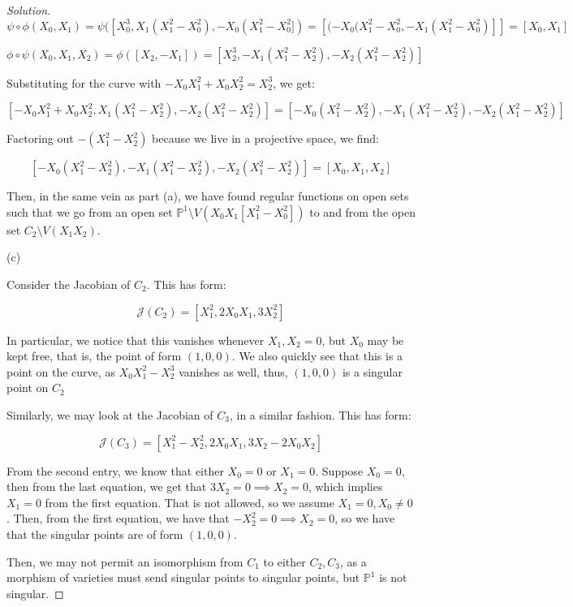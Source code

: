 \documentclass[10pt]{article}
\begin{document}
\begin{proof}[Solution]
$$\psi \circ \phi(X_0,X_1) = \psi([X_0^3, X_1(X_1^2 - X_0^2), -X_0(X_1^2 - X_0^2]) = [(-X_0(X_1^2 - X_0^2, -X_1(X_1^2 - X_0^2)]] = [X_0,X_1]$$


$$\phi \circ \psi(X_0,X_1, X_2) = \phi([X_2,-X_1]) = [X_2^3, -X_1(X_1^2-X_2^2), -X_2(X_1^2 - X_2^2)]$$

Substituting for the curve with $-X_0X_1^2  + X_0X_2^2 = X_2^3$, we get:

$$ [-X_0X_1^2  + X_0X_2^2, X_1(X_1^2-X_2^2), -X_2(X_1^2 - X_2^2)] =  [-X_0(X_1^2  - X_2^2), -X_1(X_1^2-X_2^2), -X_2(X_1^2 - X_2^2)]$$

Factoring out $-(X_1^2 - X_2^2)$ because we live in a projective space, we find:

$$[-X_0(X_1^2  - X_2^2), -X_1(X_1^2-X_2^2), -X_2(X_1^2 - X_2^2)] = [X_0,X_1,X_2]$$

Then, in the same vein as part (a), we have found regular functions on open sets such that we go from an open set $\mathbb{P}^1 \setminus V(X_0X_1[X_1^2 - X_0^2])$ to and from the open set $C_2 \setminus V(X_1X_2)$.

(c)

Consider the Jacobian of $C_2$. This has form:

$$\mathcal{J}(C_2) = [ X_1^2 , 2X_0X_1, 3X_2^2 ]$$

In particular, we notice that this vanishes whenever $X_1, X_2 = 0$, but $X_0$ may be kept free, that is, the point of form $(1,0,0)$. We also quickly see that this is a point on the curve, as $X_0 X_1^2 - X_2^3$ vanishes as well, thus, $(1,0,0)$ is a singular point on $C_2$

Similarly, we may look at the Jacobian of $C_3$, in a similar fashion. This has form:

$$\mathcal{J}(C_3) = [ X_1^2 - X_2^2 , 2X_0X_1, 3X_2 - 2X_0X_2 ]$$


From the second entry, we know that either $X_0 = 0$ or $X_1 = 0$. Suppose $X_0  = 0$, then from the last equation, we get that $3X_2 = 0 \implies X_2 = 0$, which implies $X_1 = 0$ from the first equation. That is not allowed, so we assume $X_1 = 0, X_0 \not = 0$. Then, from the first equation, we have that $-X_2^2 = 0 \implies X_2 = 0$, so we have that the singular points are of form $(1,0,0)$.

Then, we may not permit an isomorphism from $C_1$ to either $C_2, C_3$, as a morphism of varieties must send singular points to singular points, but $\mathbb{P}^1$ is not singular. 


\end{proof}
\end{document}
